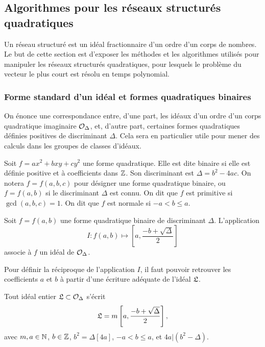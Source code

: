 \subsection{Algorithmes pour les réseaux structurés quadratiques}

Un réseau structuré est un idéal fractionnaire d'un ordre d'un corps de nombres. Le but de cette section est d'exposer les méthodes et les algorithmes utilisés pour manipuler les réseaux structurés quadratiques, pour lesquels le problème du vecteur le plus court est résolu en temps polynomial. 

\subsubsection{Forme standard d'un idéal et formes quadratiques binaires}

On énonce une correspondance entre, d'une part, les idéaux d'un ordre d'un corps quadratique imaginaire $\mathcal{O}_{\Delta}$, et, d'autre part, certaines formes quadratiques définies positives de discriminant $\Delta$. Cela sera en particulier utile pour mener des calculs dans les groupes de classes d'idéaux. 

\begin{Def}
	Soit $f = ax^2 + bxy + cy^2$ une forme quadratique. Elle est dite binaire si elle est définie positive et à coefficients dans $\mathbb{Z}$. Son discriminant est $\Delta = b^2 - 4ac$. On notera $f = f(a,b,c)$ pour désigner une forme quadratique binaire, ou $f = f(a,b)$ si le discriminant $\Delta$ est connu. On dit que $f$ est primitive si $\gcd(a, b, c) = 1$. On dit que $f$ est normale si $-a < b \leq a$.
\end{Def}

\begin{Prop}
	\label{applicationIidéalDeForme}
	Soit $f = f(a,b)$ une forme quadratique binaire de discriminant $\Delta$. L'application
	\begin{equation*}
		I : f(a,b)\mapsto\left[ a, \frac{-b + \sqrt{\Delta}}{2}\right] 
	\end{equation*}
	associe à $f$ un idéal de $\mathcal{O}_{\Delta}$. 
\end{Prop}

Pour définir la réciproque de l'application $I$, il faut pouvoir retrouver les coefficients $a$ et $b$ à partir d'une écriture adéquate de l'idéal $\mathfrak{L}$.

\begin{Prop} \label{formestandard}
	
	Tout idéal entier $\mathfrak{L}\subset\mathcal{O}_{\Delta}$ s'écrit 
	\begin{equation*}
		\mathfrak{L} = m\left[ a , \frac{-b + \sqrt{\Delta}}{2}\right],
	\end{equation*}
	avec $m,a \in\mathbb{N}$, $b\in\mathbb{Z}$, $b^{2} = \Delta [4a]$, $-a<b\leq a$, et $4a | (b^2 -\Delta)$.
\end{Prop}

